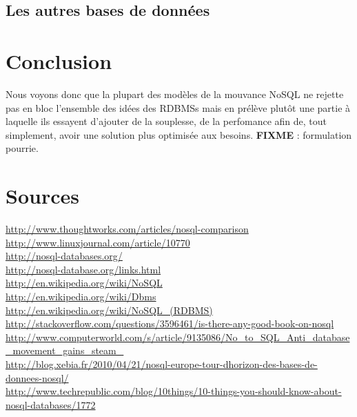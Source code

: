 \documentclass[11pt]{article}
\begin{document}
\subsection{Les autres bases de données}

\section{Conclusion}
Nous voyons donc que la plupart des modèles de la mouvance NoSQL ne rejette pas en bloc l'ensemble des idées des RDBMSs mais en prélève plutôt une partie à laquelle ils essayent d'ajouter de la souplesse, de la perfomance afin de, tout simplement, avoir une solution plus optimisée aux besoins. \textbf{FIXME} : formulation pourrie.
\section*{Sources}
\url{http://www.thoughtworks.com/articles/nosql-comparison} \\
\url{http://www.linuxjournal.com/article/10770} \\
\url{http://nosql-databases.org/} \\
\url{http://nosql-database.org/links.html} \\
\url{http://en.wikipedia.org/wiki/NoSQL} \\
\url{http://en.wikipedia.org/wiki/Dbms} \\
\url{http://en.wikipedia.org/wiki/NoSQL_(RDBMS)} \\
\url{http://stackoverflow.com/questions/3596461/is-there-any-good-book-on-nosql} \\
\url{http://www.computerworld.com/s/article/9135086/No_to_SQL_Anti_database_movement_gains_steam_} \\
\url{http://blog.xebia.fr/2010/04/21/nosql-europe-tour-dhorizon-des-bases-de-donnees-nosql/} \\
\url{http://www.techrepublic.com/blog/10things/10-things-you-should-know-about-nosql-databases/1772} \\
\end{document}
